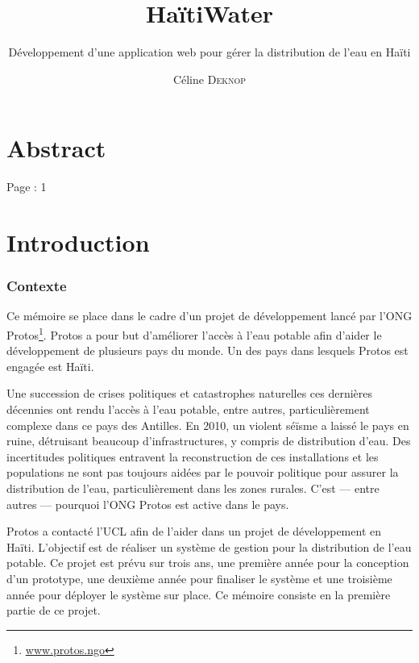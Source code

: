 \documentclass{eplmastersthesis_FR}
\title{HaïtiWater}
\subtitle{Développement d'une application web pour gérer la distribution de l'eau en Haïti}
\author{Céline \textsc{Deknop}}
\begin{document}
	\frontpage
	\tableofcontents

	\setlength{\parskip}{1.5em plus1em minus1em}


	\chapter*{Abstract}

		Page : 1

	\chapter{Introduction}


		\subsection*{Contexte}

			Ce mémoire se place dans le cadre d'un projet de développement lancé par l'ONG Protos\footnote{\href{https://www.protos.ngo/fr/}{www.protos.ngo}}. Protos a pour but d'améliorer l'accès à l'eau potable afin d'aider le développement de plusieurs pays du monde. Un des pays dans lesquels Protos est engagée est Haïti.

			Une succession de crises politiques et catastrophes naturelles ces dernières décennies ont rendu l'accès à l'eau potable, entre autres, particulièrement complexe dans ce pays des Antilles. En 2010, un violent séïsme a laissé le pays en ruine, détruisant beaucoup d'infrastructures, y compris de distribution d'eau. Des incertitudes politiques entravent la reconstruction de ces installations et les populations ne sont pas toujours aidées par le pouvoir politique pour assurer la distribution de l'eau, particulièrement dans les zones rurales. C'est --- entre autres --- pourquoi l'ONG Protos est active dans le pays.

			Protos a contacté l'UCL afin de l'aider dans un projet de développement en Haïti. L'objectif est de réaliser un système de gestion pour la distribution de l'eau potable. Ce projet est prévu sur trois ans, une première année pour la conception d'un prototype, une deuxième année pour finaliser le système et une troisième année pour déployer le système sur place. Ce mémoire consiste en la première partie de ce projet.
\end{document}
